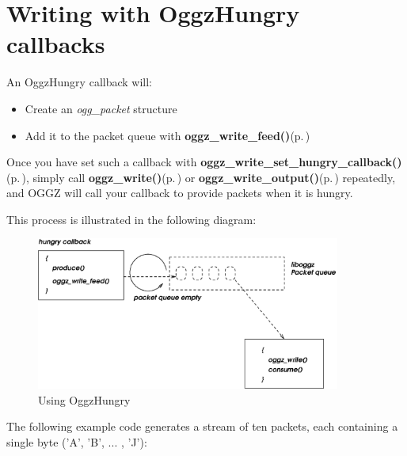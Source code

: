 \section{Writing with Oggz\-Hungry callbacks}
\label{group__hungry}
An Oggz\-Hungry callback will:\begin{itemize}
\item Create an {\em ogg\_\-packet\/} structure\item Add it to the packet queue with {\bf oggz\_\-write\_\-feed()}{\rm (p.\,\pageref{group__write__api_a2})}\end{itemize}


Once you have set such a callback with {\bf oggz\_\-write\_\-set\_\-hungry\_\-callback()}{\rm (p.\,\pageref{group__write__api_a1})}, simply call {\bf oggz\_\-write()}{\rm (p.\,\pageref{group__write__api_a4})} or {\bf oggz\_\-write\_\-output()}{\rm (p.\,\pageref{group__write__api_a3})} repeatedly, and OGGZ will call your callback to provide packets when it is hungry.

This process is illustrated in the following diagram:

\begin{figure}[H]
\begin{center}
\includegraphics[width=10cm]{hungry}\caption{Using Oggz\-Hungry}
\end{center}
\end{figure}


The following example code generates a stream of ten packets, each containing a single byte ('A', 'B', ... , 'J'):



